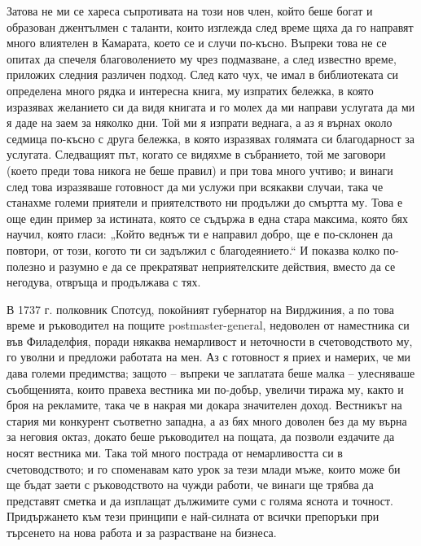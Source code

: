 \documentclass[12pt]{book}
\begin{document}
Затова не ми се хареса съпротивата на този нов член, който беше богат и образован джентълмен с таланти, които изглежда след време щяха да го направят много влиятелен в Камарата, което се и случи по-късно. Въпреки това не се опитах да спечеля благоволението му чрез подмазване, а след известно време, приложих следния различен подход. След като чух, че имал в библиотеката си определена много рядка и интересна книга, му изпратих бележка, в която изразявах желанието си да видя книгата и го молех да ми направи услугата да ми я даде на заем за няколко дни. Той ми я изпрати веднага, а аз я върнах около седмица по-късно с друга бележка, в която изразявах голямата си благодарност за услугата. Следващият път, когато се видяхме в събранието, той ме заговори (което преди това никога не беше правил) и при това много учтиво; и винаги след това изразяваше готовност да ми услужи при всякакви случаи, така че станахме големи приятели и приятелството ни продължи до смъртта му. Това е още един пример за истината, която се съдържа в една стара максима, която бях научил, която гласи: „Който веднъж ти е направил добро, ще е по-склонен да повтори, от този, когото ти си задължил с благодеянието.“ И показва колко по-полезно и разумно е да се прекратяват неприятелските действия, вместо да се негодува, отвръща и продължава с тях.

В 1737 г. полковник Спотсуд, покойният губернатор на Вирджиния, а по това време и ръководител на пощите postmaster-general, недоволен от наместника си във Филаделфия, поради някаква немарливост и неточности в счетоводството му, го уволни и предложи работата на мен. Аз с готовност я приех и намерих, че ми дава големи предимства; защото – въпреки че заплатата беше малка – улесняваше съобщенията, които правеха вестника ми по-добър, увеличи тиража му, както и броя на рекламите, така че в накрая ми докара значителен доход. Вестникът на стария ми конкурент съответно западна, а аз бях много доволен без да му върна за неговия октаз, докато беше ръководител на пощата, да позволи ездачите да носят вестника ми. Така той много пострада от немарливостта си в счетоводството; и го споменавам като урок за тези млади мъже, които може би ще бъдат заети с ръководството на чужди работи, че винаги ще трябва да представят сметка и да изплащат дължимите суми с голяма яснота и точност. Придържането към тези принципи е най-силната от всички препоръки при търсенето на нова работа и за разрастване на бизнеса.
\end{document}
